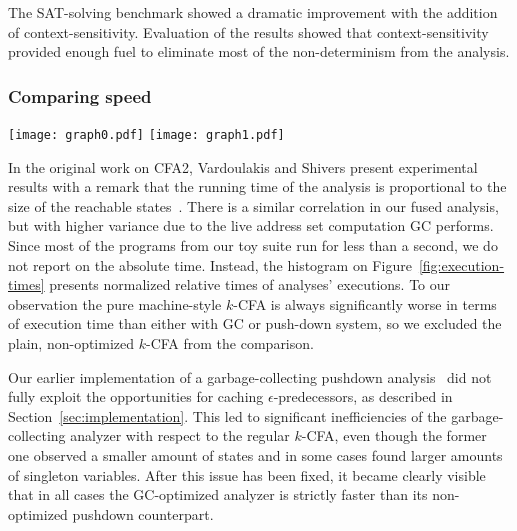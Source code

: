 The SAT-solving benchmark showed a dramatic improvement with the
addition of context-sensitivity.
Evaluation of the results showed that context-sensitivity provided
enough fuel to eliminate most of the non-determinism from the
analysis.



\subsubsection{Comparing speed}
\label{sec:comparing-speed}


\begin{figure*}
\centering
\texttt{[image: graph0.pdf]}
\hfill
\texttt{[image: graph1.pdf]}
\caption{Analysis times relative to worst (= 1) in class; smaller is
  better.  At the top is the monovariant 0CFA class of analyses, at
  the bottom is the polyvariant 1CFA class of analyses. (Non-GC
  $k$-CFA omitted.)}
\label{fig:execution-times}
\figrule
\end{figure*}


In the original work on CFA2, Vardoulakis and Shivers present
experimental results with a remark that the running time of the
analysis is proportional to the size of the reachable
states~\cite[Section 6]{mattmight:Vardoulakis:2010:CFA2}. There
is a similar correlation in our fused analysis,
but with higher variance due to the live address set computation GC performs.
Since most of the programs from our toy suite run for less than a
second, we do not report on the absolute time. Instead, the histogram
on Figure~\ref{fig:execution-times} presents normalized relative times
of analyses' executions. To our observation the pure machine-style
$k$-CFA is always significantly worse in terms of execution time than
either with GC or push-down system, so we excluded the plain,
non-optimized $k$-CFA from the comparison.

Our earlier implementation of a garbage-collecting pushdown
analysis~\cite{mattmight:Earl:2012:Introspective} did not fully
exploit the opportunities for caching $\epsilon$-predecessors, as
described in Section~\ref{sec:implementation}. This led to significant
inefficiencies of the garbage-collecting analyzer with respect to the
regular $k$-CFA, even though the former one observed a smaller amount of
states and in some cases found larger amounts of singleton
variables. After this issue has been fixed, it became clearly visible
that in all cases the GC-optimized analyzer is strictly faster than
its non-optimized pushdown counterpart.

